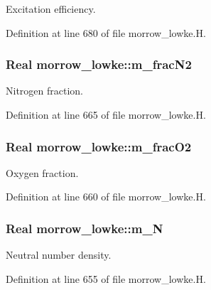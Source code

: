 Excitation efficiency. 



Definition at line 680 of file morrow\+\_\+lowke.\+H.

\subsubsection[{\texorpdfstring{m\+\_\+frac\+N2}{m_fracN2}}]{\setlength{\rightskip}{0pt plus 5cm}Real morrow\+\_\+lowke\+::m\+\_\+frac\+N2}\hypertarget{classmorrow__lowke_ad58c00d8a80d4fc657e94470114b7969}{}\label{classmorrow__lowke_ad58c00d8a80d4fc657e94470114b7969}


Nitrogen fraction. 



Definition at line 665 of file morrow\+\_\+lowke.\+H.

\subsubsection[{\texorpdfstring{m\+\_\+frac\+O2}{m_fracO2}}]{\setlength{\rightskip}{0pt plus 5cm}Real morrow\+\_\+lowke\+::m\+\_\+frac\+O2}\hypertarget{classmorrow__lowke_ac8f7aec7cad8720dbdca3840adf769ae}{}\label{classmorrow__lowke_ac8f7aec7cad8720dbdca3840adf769ae}


Oxygen fraction. 



Definition at line 660 of file morrow\+\_\+lowke.\+H.

\subsubsection[{\texorpdfstring{m\+\_\+N}{m_N}}]{\setlength{\rightskip}{0pt plus 5cm}Real morrow\+\_\+lowke\+::m\+\_\+N}\hypertarget{classmorrow__lowke_a89109e1a83cda4eab5d4505e9f043d2c}{}\label{classmorrow__lowke_a89109e1a83cda4eab5d4505e9f043d2c}


Neutral number density. 



Definition at line 655 of file morrow\+\_\+lowke.\+H.

